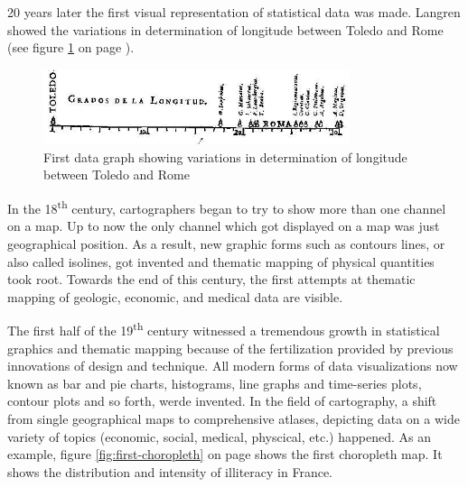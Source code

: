 20 years later the first visual representation of statistical data was made. Langren showed the variations in determination of longitude between Toledo and Rome (see figure \ref{fig:langren} on page \pageref{fig:langren}).

\begin{figure}[!htb]
\centering
\includegraphics[width=0.8\textwidth,keepaspectratio]{images/history/langren.jpg}
\caption[
    First data graph showing variations in determination of longitude between Toledo and Rome, Urldate: 07.2016 \newline
\small\texttt{\url{http://datavis.ca/milestones//admin/uploads/images/tufte/langren.jpg}}
]{First data graph showing variations in determination of longitude between Toledo and Rome}
\label{fig:langren}
\end{figure}

In the 18\textsuperscript{th} century, cartographers began to try to show more than one channel on a map. Up to now the only channel which got displayed on a map was just geographical position. As a result, new graphic forms such as contours lines, or also called isolines, got invented and thematic mapping of physical quantities took root. Towards the end of this century, the first attempts at thematic mapping of geologic, economic, and medical data are visible.

The first half of the 19\textsuperscript{th} century witnessed a tremendous growth in statistical graphics and thematic mapping because of the fertilization provided by previous innovations of design and technique. All modern forms of data visualizations now known as bar and pie charts, histograms, line graphs and time-series plots, contour plots and so forth, werde invented. In the field of cartography, a shift from single geographical maps to comprehensive atlases, depicting data on a wide variety of topics (economic, social, medical, physcical, etc.) happened. As an example, figure \ref{fig:first-choropleth} on page \pageref{fig:first-choropleth} shows the first choropleth map. It shows the distribution and intensity of illiteracy in France.

